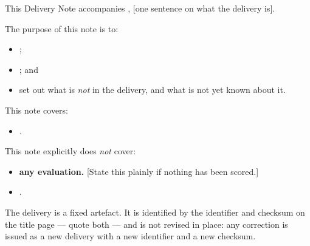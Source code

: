 %
%

This Delivery Note accompanies \texttt{\deliveryid}, [one sentence on what the delivery is].

The purpose of this note is to:
\begin{itemize}
    \item [...];
    \item [...]; and
    \item set out what is \emph{not} in the delivery, and what is not yet known about it.
\end{itemize}

\noindent This note covers:
\begin{itemize}
    \item [... (Section~\ref{sec:files})].
\end{itemize}

\noindent This note explicitly does \emph{not} cover:
\begin{itemize}
    \item \textbf{any evaluation.} [State this plainly if nothing has been scored.]
    \item [...].
\end{itemize}

\noindent The delivery is a fixed artefact. It is identified by the identifier and checksum on the
title page --- quote both --- and is not revised in place: any correction is issued as a new
delivery with a new identifier and a new checksum.
